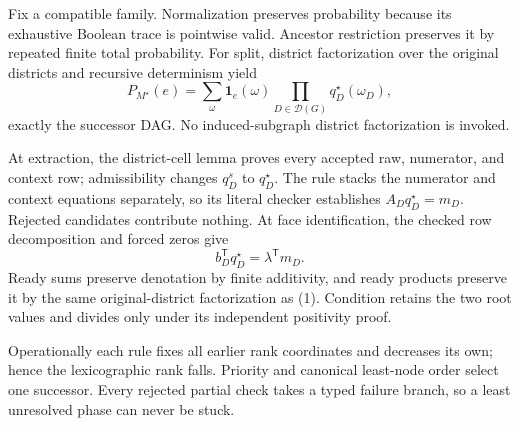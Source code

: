 Fix a compatible family.  Normalization preserves probability because its exhaustive Boolean trace is pointwise valid.  Ancestor restriction preserves it by repeated finite total probability.  For split, district factorization over the original districts and recursive determinism yield
\[
P_{M^\star}(e)=\sum_{\omega}\mathbf1_e(\omega)\prod_{D\in\mathcal D(G)}q_D^\star(\omega_D),
\tag{1}
\]
exactly the successor DAG.  No induced-subgraph district factorization is invoked.

At extraction, the district-cell lemma proves every accepted raw, numerator, and context row; admissibility changes \(q_D^s\) to \(q_D^\star\).  The rule stacks the numerator and context equations separately, so its literal checker establishes \(A_Dq_D^\star=m_D\).  Rejected candidates contribute nothing.  At face identification, the checked row decomposition and forced zeros give
\[
b_D^{\mathsf T}q_D^\star=\lambda^{\mathsf T}m_D.
\tag{2}
\]
Ready sums preserve denotation by finite additivity, and ready products preserve it by the same original-district factorization as (1).  Condition retains the two root values and divides only under its independent positivity proof.

Operationally each rule fixes all earlier rank coordinates and decreases its own; hence the lexicographic rank falls.  Priority and canonical least-node order select one successor.  Every rejected partial check takes a typed failure branch, so a least unresolved phase can never be stuck.